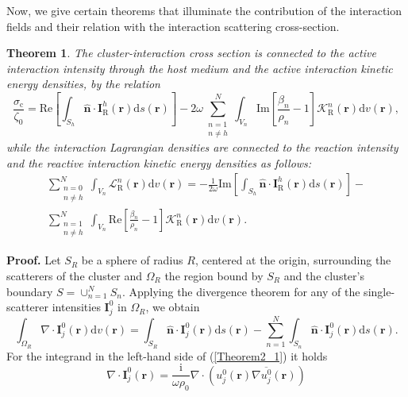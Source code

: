 \documentclass{article}
\newtheorem{theorem}{Theorem}
\begin{document}
Now, we give certain theorems that illuminate the contribution of the interaction fields and their relation with the interaction scattering cross-section. 
%
\begin{theorem}\label{Theorem1}
The cluster-interaction cross section is connected to the active interaction intensity through the host medium and the active interaction kinetic energy densities, by the relation
\begin{equation}
\label{Theorem2_01}
\frac{\sigma_{\mathrm{c}}}{\zeta_0}=\mathrm{Re}\left[\int_{S_h}\hat{\mathbf{n}}\cdot\mathbf{I}_{\mathrm{R}}^{h}(\mathbf{r})\mathrm{d}s(\mathbf{r})\right]-2\omega\sum_{\substack{n=1\\n\ne h}}^{N}\int_{V_n}\mathrm{Im}\left[\frac{\beta_n}{\rho_n}-1\right]\mathcal{K}_{\mathrm{R}}^n(\mathbf{r})\mathrm{d}v(\mathbf{r}),
\end{equation}
%
while the interaction Lagrangian densities are connected to the reaction intensity and the reactive interaction kinetic energy densities as follows:
%
\begin{align}
\nonumber
\sum_{\substack{n=0\\n\ne h}}^{N}\int_{V_n}\mathcal{L}_{\mathrm{R}}^n(\mathbf{r})\mathrm{d}v(\mathbf{r})=-\frac{1}{2\omega}\mathrm{Im}\left[\int_{S_h}\hat{\mathbf{n}}\cdot\mathbf{I}_{\mathrm{R}}^{h}(\mathbf{r})\mathrm{d}s(\mathbf{r})\right]-\\\sum_{\substack{n=1\\n\ne h}}^{N}\int_{V_n}\mathrm{Re}\left[\frac{\beta_n}{\rho_n}-1\right]\mathcal{K}_{\mathrm{R}}^n(\mathbf{r})\mathrm{d}v(\mathbf{r}).
\label{Theorem2_02}
\end{align}
%
\end{theorem}
%
\textbf{Proof.}
Let $S_R$ be a sphere of radius $R$, centered at the origin, surrounding the scatterers of the cluster and $\Omega_R$ the region bound by $S_R$ and the cluster's boundary $S=\cup_{n=1}^{N}S_n$. Applying the divergence theorem for any of the single-scatterer intensities $\mathbf{I}_j^{0}$ in $\Omega_R$, we obtain
%
\begin{equation}
\label{Theorem2_1}    \int_{\Omega_R}\nabla\cdot\mathbf{I}_j^0(\mathbf{r})\mathrm{d}v(\mathbf{r})=\int_{S_R}\hat{\mathbf{n}}\cdot\mathbf{I}_j^0(\mathbf{r})\mathrm{d}s(\mathbf{r})-\sum_{n=1}^{N}\int_{S_n}\hat{\mathbf{n}}\cdot\mathbf{I}_j^0(\mathbf{r})\mathrm{d}s(\mathbf{r}).
\end{equation}
%
For the integrand in the left-hand side of (\ref{Theorem2_1}) it holds
%
\begin{equation}
\nabla\cdot\mathbf{I}_j^0(\mathbf{r})=\frac{\mathrm{i}}{\omega\rho_0}\nabla\cdot\left(u_j^0(\mathbf{r})\nabla\overline{u_j^0}(\mathbf{r})\right)
\end{equation}
\end{document}
